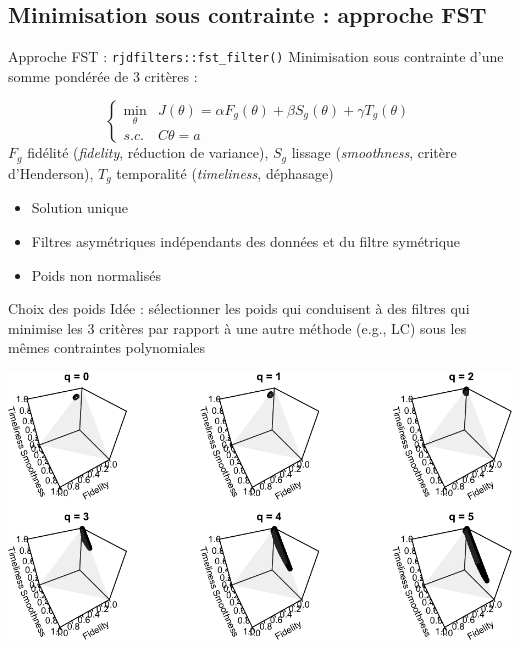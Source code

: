 \documentclass[10pt,xcolor=table,color={dvipsnames,usenames},ignorenonframetext,usepdftitle=false,french]{beamer}
\newcommand\1{\mathds{1}}
\begin{document}
\hypertarget{minimisation-sous-contrainte-approche-fst}{%
\subsection{Minimisation sous contrainte : approche
FST}\label{minimisation-sous-contrainte-approche-fst}}

\begin{frame}{Approche FST : \texttt{rjdfilters::fst\_filter()}}
\protect\hypertarget{approche-fst-rjdfiltersfst_filter}{}
Minimisation sous contrainte d'une somme pondérée de 3 critères :

\[
\begin{cases}
\underset{\theta}{\min} & J(\theta)=
\alpha F_g(\theta)+\beta S_g(\theta)+\gamma T_g(\theta)\\
s.c. & C\theta=a
\end{cases}
\] \(F_g\) fidélité (\emph{fidelity}, réduction de variance), \(S_g\)
lissage (\emph{smoothness}, critère d'Henderson), \(T_g\) temporalité
(\emph{timeliness}, déphasage)

\pause

\begin{summary}

\begin{itemize}
\item
  \bcsmbh Solution unique
\item
  \bcsmbh Filtres asymétriques indépendants des données et du filtre
  symétrique
\item
  \bcsmmh Poids non normalisés
\end{itemize}

\end{summary}
\end{frame}

\begin{frame}{Choix des poids}
\protect\hypertarget{choix-des-poids}{}
Idée : sélectionner les poids qui conduisent à des filtres qui minimise
les 3 critères par rapport à une autre méthode (e.g., LC) sous les mêmes
contraintes polynomiales

\begin{center}\includegraphics[height=0.6\paperheight]{img/lc6d0-1} \end{center}
\end{frame}
\end{document}
